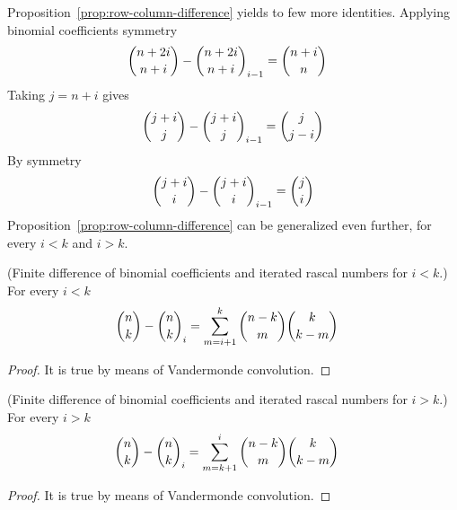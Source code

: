 Proposition~\eqref{prop:row-column-difference} yields to few more identities.
Applying binomial coefficients symmetry
\begin{align*}
    \binom{n+2i}{n+i} - \binom{n+2i}{n+i}_{i-1} &= \binom{n+i}{n}
\end{align*}
Taking $j=n+i$ gives
\begin{align*}
    \binom{j+i}{j} - \binom{j+i}{j}_{i-1} = \binom{j}{j-i}
\end{align*}
By symmetry
\begin{align*}
    \binom{j+i}{i} - \binom{j+i}{i}_{i-1} = \binom{j}{i}
\end{align*}
Proposition~\eqref{prop:row-column-difference} can be generalized even further, for every $i<k$ and $i>k$.
\begin{proposition}
(Finite difference of binomial coefficients and iterated rascal numbers for $i<k$.)
    For every $i<k$
    \label{prop:row-column-difference-general}
    \begin{align*}
        \binom{n}{k} - \binom{n}{k}_{i} &= \sum_{m=i+1}^{k} \binom{n-k}{m} \binom{k}{k-m}
    \end{align*}
    \begin{proof}
        It is true by means of Vandermonde convolution.
    \end{proof}
\end{proposition}
\begin{proposition}
(Finite difference of binomial coefficients and iterated rascal numbers for $i>k$.)
    For every $i>k$
    \label{prop:row-column-difference-general-i-greater-k}
    \begin{align*}
        \binom{n}{k} - \binom{n}{k}_{i} &= \sum_{m=k+1}^{i} \binom{n-k}{m} \binom{k}{k-m}
    \end{align*}
    \begin{proof}
        It is true by means of Vandermonde convolution.
    \end{proof}
\end{proposition}
